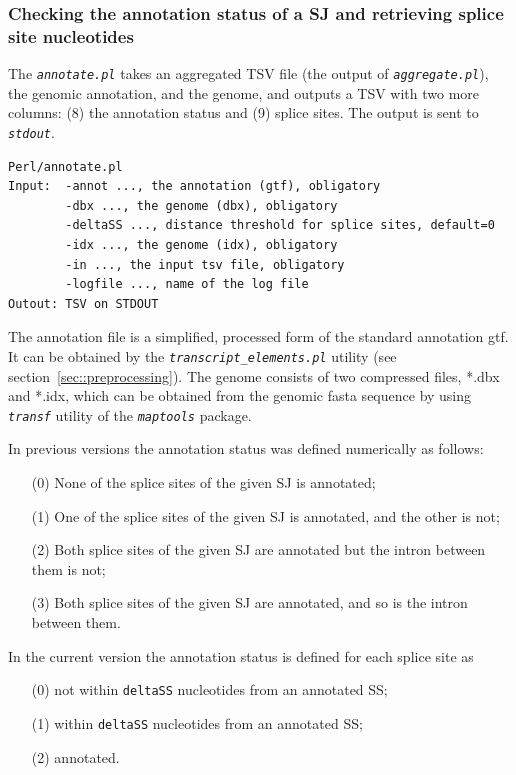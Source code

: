 \documentclass{article}
\newcommand{\prog}[1]{{\tt\em #1}}
\begin{document}
\subsubsection[Annotation status and splice site nucleotides]{Checking the annotation status of a SJ and retrieving splice site nucleotides}
\label{sec::annotation_status}
The \prog{annotate.pl} takes an aggregated TSV file (the output of \prog{aggregate.pl}), the genomic annotation, and the genome, and outputs a TSV 
with two more columns: (8) the annotation status and (9) splice sites. The output is sent to \prog{stdout}.
\begin{verbatim}
Perl/annotate.pl
Input:  -annot ..., the annotation (gtf), obligatory
        -dbx ..., the genome (dbx), obligatory
        -deltaSS ..., distance threshold for splice sites, default=0
        -idx ..., the genome (idx), obligatory
        -in ..., the input tsv file, obligatory
        -logfile ..., name of the log file
Outout: TSV on STDOUT
\end{verbatim}
The annotation file is a simplified, processed form of the standard annotation gtf. It can be obtained by the \prog{transcript\_elements.pl} utility (see section~\ref{sec::preprocessing}).
The genome consists of two compressed files, *.dbx and *.idx, which can be obtained from the genomic fasta sequence by using \prog{transf} utility of the \prog{maptools} package. 

In previous versions the annotation status was defined numerically as follows:
\begin{enumerate}
\item[(0)] None of the splice sites of the given SJ is annotated;
\item[(1)] One of the splice sites of the given SJ is annotated, and the other is not;
\item[(2)] Both splice sites of the given SJ are annotated but the intron between them is not;
\item[(3)] Both splice sites of the given SJ are annotated, and so is the intron between them.
\end{enumerate}

In the current version the annotation status is defined for each splice site as
\begin{enumerate}
\item[(0)] not within {\tt deltaSS} nucleotides from an annotated SS;
\item[(1)] within {\tt deltaSS} nucleotides from an annotated SS;
\item[(2)] annotated.
\end{enumerate}
\end{document}
